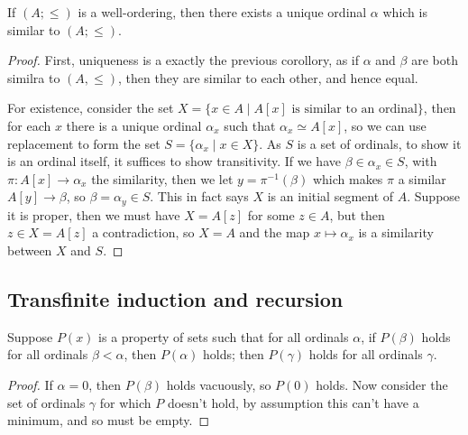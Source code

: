 \documentclass{article}
\begin{document}
\begin{theorem}
    If $(A;\leq)$ is a well-ordering, then there exists a unique ordinal $\alpha$ which is similar to $(A;\leq)$.\begin{proof}
        First, uniqueness is a exactly the previous corollory, as if $\alpha$ and $\beta$ are both similra to $(A,\leq)$, then they are similar to each other, and hence equal.

        For existence, consider the set $X = \{x\in A \mid A[x] \text{ is similar to an ordinal}\}$, then for each $x$ there is a unique ordinal $\alpha_x$ such that $\alpha_x\simeq A[x]$, so we can use replacement to form the set $S = \{\alpha_x \mid x\in X\}$. As $S$ is a set of ordinals, to show it is an ordinal itself, it suffices to show transitivity. If we have $\beta \in \alpha_x \in S$, with $\pi:A[x]\rightarrow \alpha_x$ the similarity, then we let $y = \pi^{-1}(\beta)$ which makes $\pi$ a similar $A[y]\rightarrow \beta$, so $\beta = \alpha_y \in S$. This in fact says $X$ is an initial segment of $A$. Suppose it is proper, then we must have $X = A[z]$ for some $z\in A$, but then $z \in X = A[z]$ a contradiction, so $X=A$ and the map $x\mapsto \alpha_x$ is a similarity between $X$ and $S$.
    \end{proof}
\end{theorem}

\subsection{Transfinite induction and recursion}

\begin{theorem}
    Suppose $P(x)$ is a property of sets such that for all ordinals $\alpha$, if $P(\beta)$ holds for all ordinals $\beta < \alpha$, then $P(\alpha)$ holds; then $P(\gamma)$ holds for all ordinals $\gamma$.
    \begin{proof}
        If $\alpha = 0$, then $P(\beta)$ holds vacuously, so $P(0)$ holds. Now consider the set of ordinals $\gamma$ for which $P$ doesn't hold, by assumption this can't have a minimum, and so must be empty.
    \end{proof}
\end{theorem}
\end{document}
